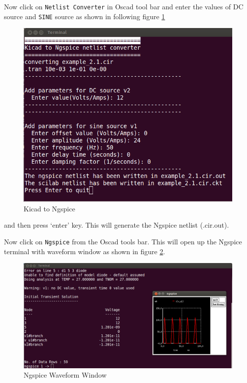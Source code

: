 \begin{enumerate}
Now click on {\tt Netlist Converter} in Oscad tool bar and enter the values of DC source and {\tt SINE} source as shown in following figure \ref{apd9}
\begin{figure}
\begin{center}
\includegraphics[width=1\linewidth]{figures/apd9.png}
\caption{Kicad to Ngspice}
\label{apd9}
\end{center}
\end{figure}
and then press `enter' key. This will generate the Ngspice netlist (.cir.out).

Now click on {\tt Ngspice} from the Oscad tools bar. This will open up the Ngspice terminal with waveform window as shown in figure \ref{apd10}.

\begin{figure}
\begin{center}
\includegraphics[width=1\linewidth]{figures/apd10.png}
\caption{Ngspice Waveform Window}
\label{apd10}
\end{center}
\end{figure}


\end{enumerate}
